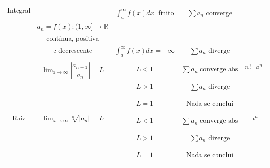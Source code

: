 \documentclass[12pt]{article}
\begin{document}
\begin{table}[h!]
\begin{tabular}{|c|c|c|c|c|c|}
		\hline
		\multirow{8}{*}{Integral} & \multicolumn{2}{c|}{}&&&\\
		&\multicolumn{2}{c|}{}& $ \displaystyle \int_{a}^{\infty} f(x) dx \;\text{ finito}$ & $\displaystyle \sum a_n \text{ converge}$ &\\
		&\multicolumn{2}{c|}{$a_n = f(x): (1,\infty]\rightarrow \mathds{R}$}&&&\\
		\cline{4-5}
		&\multicolumn{2}{c|}{contínua, positiva}&&&\\
		&\multicolumn{2}{c|}{e decrescente}& $ \displaystyle \int_{a}^{\infty} f(x) dx = \pm \infty$ & $\displaystyle \sum a_n \text{ diverge}$ &\\
		&\multicolumn{2}{c|}{}&&&\\
		\hline
		\multirow{9}{*}{Razão} & \multicolumn{2}{c|}{\multirow{9}{*}{$ \displaystyle \lim_{n \rightarrow \infty} \left|\dfrac{a_{n+1}}{a_n}\right| = L$}} &&& \multirow{9}{*}{$n!, \; a^n$}\\
		&\multicolumn{2}{c|}{}& $L < 1$ & $\displaystyle \sum a_n \text{ converge abs}$ &\\
		&\multicolumn{2}{c|}{}&&&\\
		\cline{4-5}
		&\multicolumn{2}{c|}{}&&&\\
		&\multicolumn{2}{c|}{}& $L > 1$ & $\displaystyle \sum a_n \text{ diverge}$ &\\
		&\multicolumn{2}{c|}{}&&&\\
		\cline{4-5}
		&\multicolumn{2}{c|}{}&&&\\
		&\multicolumn{2}{c|}{}& $L = 1$ & Nada se conclui &\\
		&\multicolumn{2}{c|}{}&&&\\
		\hline
		\multirow{9}{*}{Raiz} & \multicolumn{2}{c|}{\multirow{9}{*}{$ \displaystyle \lim_{n \rightarrow \infty} \sqrt[n]{\left|a_n\right|} = L$}} &&& \multirow{9}{*}{$\; a^n$}\\
		&\multicolumn{2}{c|}{}& $L < 1$ & $\displaystyle \sum a_n \text{ converge abs}$ &\\
		&\multicolumn{2}{c|}{}&&&\\
		\cline{4-5}
		&\multicolumn{2}{c|}{}&&&\\
		&\multicolumn{2}{c|}{}& $L > 1$ & $\displaystyle \sum a_n \text{ diverge}$ &\\
		&\multicolumn{2}{c|}{}&&&\\
		\cline{4-5}
		&\multicolumn{2}{c|}{}&&&\\
		&\multicolumn{2}{c|}{}& $L = 1$ & Nada se conclui &\\
		&\multicolumn{2}{c|}{}&&&\\
		\hline
	\end{tabular}
\end{table}
\end{document}

